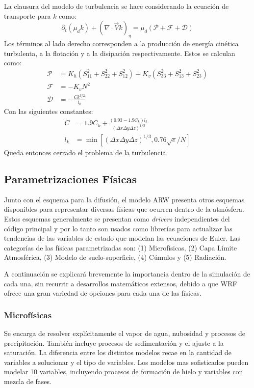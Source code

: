 La clausura del modelo de turbulencia se hace considerando la ecuación de transporte para $k$ como:
\begin{equation}
\partial_t(\mu_d k) + (\nabla\cdot\vec{V}k)_\eta = \mu_d(\mathcal{P} + \mathcal{F} + \mathcal{D})
\end{equation}
Los términos al lado derecho corresponden a la producción de energía cinética turbulenta, a la flotación y a la disipación respectivamente. Estos se calculan como:
\begin{align}
	\mathcal{P}&= K_h (S_{11}^2 + S_{22}^2 + S_{12}^2) + K_v (S_{33}^2 + S_{13}^2 + S_{23}^2)\\
	\mathcal{F}&=-K_v N^2\\
	\mathcal{D}&=-\frac{C k^{3/2}}{l_k}
\end{align}
Con las siguientes constantes:
\begin{align}
	C &= 1.9C_k + \frac{(0.93 - 1.9 C_k)l_k}{(\Delta x \Delta y \Delta z)^{1/3}}\\
	l_k &= \min[(\Delta x \Delta y \Delta z)^{1/3}, 0.76\sqrt{e}/N]
\end{align}
Queda entonces cerrado el problema de la turbulencia.
\subsection{Parametrizaciones Físicas}
Junto con el esquema para la difusión, el modelo ARW presenta otros esquemas disponibles para representar diversas físicas que ocurren dentro de la atmósfera. Estos esquemas generalmente se presentan como \emph{drivers} independientes del código principal y por lo tanto son usados como librerías para actualizar las tendencias de las variables de estado que modelan las ecuaciones de Euler. Las categorías de las físicas parametrizadas son: (1) Microfísicas, (2) Capa Límite Atmosférica, (3) Modelo de suelo-superficie, (4) Cúmulos y (5) Radiación.

A continuación se explicará brevemente la importancia dentro de la simulación de cada una, sin recurrir a desarrollos matemáticos extensos, debido a que WRF ofrece una gran variedad de opciones para cada una de las físicas.
\subsubsection{Microfísicas}
Se encarga de resolver explícitamente el vapor de agua, nubosidad y procesos de precipitación. También incluye procesos de sedimentación y el ajuste a la saturación. La diferencia entre los distintos modelos recae en la cantidad de variables a solucionar y el tipo de variables. Los modelos mas sofisticados pueden modelar 10 variables, incluyendo procesos de formación de hielo y variables con mezcla de fases.
